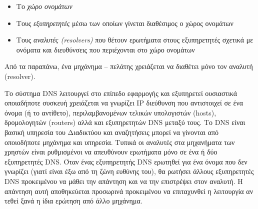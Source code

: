 \begin{itemize}
\item Το \emph{χώρο ονομάτων}
\item Τους \emph{εξυπηρετητές} μέσω των οποίων γίνεται διαθέσιμος ο χώρος ονομάτων
\item Τους \emph{αναλυτές (resolvers)} που θέτουν ερωτήματα στους εξυπηρετητές σχετικά με ονόματα και διευθύνσεις που περιέχονται στο χώρο ονομάτων
\end{itemize}

Από τα παραπάνω, ένα μηχάνημα -- πελάτης χρειάζεται να διαθέτει μόνο τον αναλυτή (resolver).

Το σύστημα DNS λειτουργεί στο επίπεδο εφαρμογής και εξυπηρετεί ουσιαστικά οποιαδήποτε συσκευή χρειάζεται να γνωρίζει IP διεύθυνση που αντιστοιχεί σε ένα όνομα (ή το αντίθετο), περιλαμβανομένων τελικών υπολογιστών (hosts), δρομολογητών (routers) αλλά και εξυπηρετητών DNS
μεταξύ τους. Το DNS είναι βασική υπηρεσία του Διαδικτύου και αναζητήσεις μπορεί να γίνονται από οποιοδήποτε μηχάνημα και υπηρεσία. Τυπικά οι αναλυτές στα μηχανήματα των χρηστών είναι ρυθμισμένοι να απευθύνουν ερωτήματα μόνο σε ένα ή δύο εξυπηρετητές DNS. Όταν ένας εξυπηρετητής DNS ερωτηθεί για ένα όνομα που δεν γνωρίζει (γιατί είναι έξω από τη ζώνη ευθύνης του), θα ρωτήσει άλλους εξυπηρετητές DNS προκειμένου να μάθει την απάντηση και να την επιστρέψει στον αναλυτή. Η απάντηση αυτή αποθηκεύεται προσωρινά προκειμένου να επιταχυνθεί η λειτουργία αν τεθεί ξανά η ίδια ερώτηση από άλλο μηχάνημα.